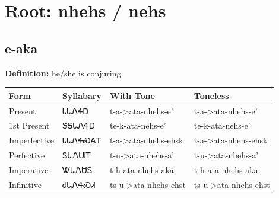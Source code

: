 \documentclass{article}%
\begin{document}
%
\normalsize%
\section*{Root: nhehs / nehs}%
\subsection*{e-aka}%
\textbf{Definition: }%
he/she is conjuring%
\\[0.5em]%
\begin{tabular}{|l|l|l|l|}%
\hline%
\textbf{Form}&\textbf{Syllabary}&\textbf{With Tone}&\textbf{Toneless}\\%
\hline%
Present&ᏓᏓᏁᏎᎠ&t{-}a{-}>ata{-}nhehs{-}e'&t{-}a{-}>ata{-}nhehs{-}e'\\%
1st Present&ᏕᎦᏓᏁᏎᎠ&te{-}k{-}ata{-}nehs{-}e'&te{-}k{-}ata{-}nehs{-}e'\\%
Imperfective&ᏓᏓᏁᏎᏍᎪᎢ&t{-}a{-}>ata{-}nhehs{-}ehsk&t{-}a{-}>ata{-}nhehs{-}ehsk\\%
Perfective&ᏚᏓᏁᏌᎥᎢ&t{-}u{-}>ata{-}nhehs{-}a'&t{-}u{-}>ata{-}nhehs{-}a'\\%
Imperative&ᏔᏓᏁᏌᎦ&t{-}h{-}ata{-}nhehs{-}aka&t{-}h{-}ata{-}nhehs{-}aka\\%
Infinitive&ᏧᏓᏁᏎᏍᏗ&ts{-}u{-}>ata{-}nhehs{-}ehst&ts{-}u{-}>ata{-}nhehs{-}ehst\\%
\hline%
\end{tabular}%
\\[1em]%
\end{document}
